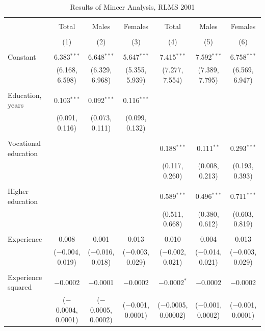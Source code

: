 \documentclass[12pt,a4paper]{article}
\numberwithin{equation}{section}
\begin{document}
\begin{landscape}
	
	\fontsize{9}{11}
	\selectfont
	
	\begin{table}[!htbp] \centering 
		\caption{Results of Mincer Analysis, RLMS 2001} 
		\label{} 
		\begin{tabular}{@{\extracolsep{5pt}}lcccccc} 
			\\[-1.8ex]\hline 
			\hline \\[-1.8ex] 
			& Total & Males & Females & Total & Males & Females \\ 
			\\[-1.8ex] & (1) & (2) & (3) & (4) & (5) & (6)\\ 
			\hline \\[-1.8ex] 
			Constant & 6.383$^{***}$ & 6.648$^{***}$ & 5.647$^{***}$ & 7.415$^{***}$ & 7.592$^{***}$ & 6.758$^{***}$ \\ 
			& (6.168, 6.598) & (6.329, 6.968) & (5.355, 5.939) & (7.277, 7.554) & (7.389, 7.795) & (6.569, 6.947) \\ 
			& & & & & & \\ 
			Education, years & 0.103$^{***}$ & 0.092$^{***}$ & 0.116$^{***}$ &  &  &  \\ 
			& (0.091, 0.116) & (0.073, 0.111) & (0.099, 0.132) &  &  &  \\ 
			& & & & & & \\ 
			Vocational education &  &  &  & 0.188$^{***}$ & 0.111$^{**}$ & 0.293$^{***}$ \\ 
			&  &  &  & (0.117, 0.260) & (0.008, 0.213) & (0.193, 0.393) \\ 
			& & & & & & \\ 
			Higher education &  &  &  & 0.589$^{***}$ & 0.496$^{***}$ & 0.711$^{***}$ \\ 
			&  &  &  & (0.511, 0.668) & (0.380, 0.612) & (0.603, 0.819) \\ 
			& & & & & & \\ 
			Experience & 0.008 & 0.001 & 0.013 & 0.010 & 0.004 & 0.013 \\ 
			& ($-$0.004, 0.019) & ($-$0.016, 0.018) & ($-$0.003, 0.029) & ($-$0.002, 0.021) & ($-$0.014, 0.021) & ($-$0.003, 0.029) \\ 
			& & & & & & \\ 
			Experience squared & $-$0.0002 & $-$0.0001 & $-$0.0002 & $-$0.0002$^{*}$ & $-$0.0002 & $-$0.0002 \\ 
			& ($-$0.0004, 0.0001) & ($-$0.0005, 0.0002) & ($-$0.001, 0.0001) & ($-$0.0005, 0.00002) & ($-$0.001, 0.0002) & ($-$0.001, 0.0001) \\ 

\end{tabular}
\end{table}
\end{landscape}
\end{document}
